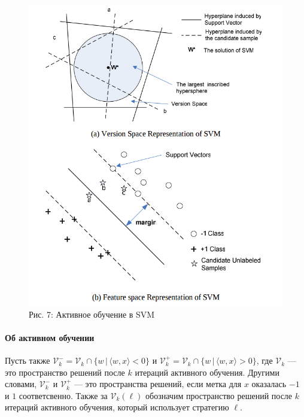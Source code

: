 \documentclass[]{article}
\let\oldparagraph\paragraph
\renewcommand{\paragraph}[1]{\oldparagraph{#1}\mbox{}}
\begin{document}
\begin{figure}[htbp]
\centering
\includegraphics[width=5.72917in]{img/svm+al.png}
\caption{Рис. 7: Активное обучение в SVM}
\end{figure}

\paragraph{Об активном
обучении}\label{ux43eux431-ux430ux43aux442ux438ux432ux43dux43eux43c-ux43eux431ux443ux447ux435ux43dux438ux438}

Пусть также
\(\mathcal{V}_k^- = \mathcal{V}_k \cap \{w\,|\, \langle w, x\rangle < 0\}\)
и
\(\mathcal{V}_k^+ = \mathcal{V}_k \cap \{w\,|\, \langle w, x\rangle > 0\}\),
где \(\mathcal{V}_k\) --- это пространство решений после \(k\) итераций
активного обучения. Другими словами, \(\mathcal{V}_k^-\) и
\(\mathcal{V}_k^+\) --- это пространства решений, если метка для \(x\)
оказалась \(-1\) и \(1\) соответсвенно. Также за \(\mathcal{V}_k(\ell)\)
обозначим пространство решений после \(k\) итераций активного обучения,
который использует стратегию \(\ell\).
\end{document}
